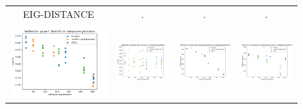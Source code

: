 \begin{figure}
\begin{tabular}{@{\hskip -0.0in}c@{\hskip -0.0in}c@{\hskip -0.0in}c@{\hskip -0.0in}c@{\hskip -0.0in}}
		EIG-DISTANCE & . & . & . \\
		\includegraphics[width=.245\linewidth]{figures/fasttext1m_qa_best-f1_vs_subspace-eig-distance_linx.pdf} &
		\includegraphics[width=.245\linewidth]{figures/fasttext1m_sentiment_trec_test-acc_vs_subspace-eig-distance_linx.pdf} &
		\includegraphics[width=.245\linewidth]{figures/fasttext1m_intrinsics_analogy-avg-score_vs_subspace-eig-distance_linx.pdf} &
		\includegraphics[width=.245\linewidth]{figures/fasttext1m_intrinsics_similarity-avg-score_vs_subspace-eig-distance_linx.pdf} \\
		

\end{tabular}
\end{figure}
